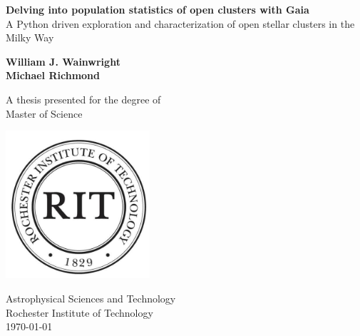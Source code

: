 \documentclass{article}
\begin{document}
\begin{titlepage}
   \begin{center}
       \vspace*{1cm}
       
       \huge
       \textbf{Delving into population statistics of open clusters with Gaia}
       \large
       \vspace{0.5cm} \\
        A Python driven exploration and characterization of open stellar clusters in the Milky Way
            
       \vspace{1.5cm}

       \huge
       \textbf{William J. Wainwright} \\
       \vspace{0.25cm}
       \large
       \textbf{Michael Richmond}
       \normalsize

       \vfill
            
       A thesis presented for the degree of\\
       Master of Science
            
     
       \includegraphics[width=0.4\textwidth]{figures/RIT_seal.jpg}
            
       Astrophysical Sciences and Technology\\
       Rochester Institute of Technology\\
       \today
            
   \end{center}
\end{titlepage}
\end{document}
